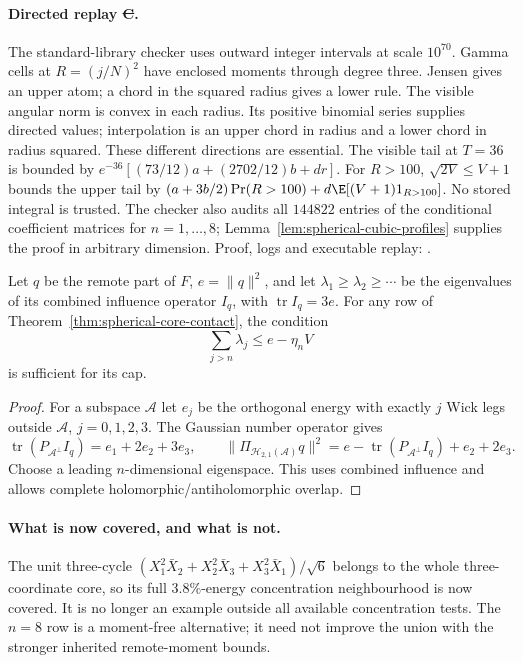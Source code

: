 \paragraph{Directed replay \st{C}.}
The standard-library checker uses outward integer intervals at scale
$10^{70}$. Gamma cells at $R=(j/N)^2$ have enclosed moments through
degree three. Jensen gives an upper atom; a chord in the squared
radius gives a lower rule. The visible angular norm is convex in
each radius. Its positive binomial series supplies directed values;
interpolation is an upper chord in radius and a lower chord in radius
squared. These different directions are essential.
The visible tail at $T=36$ is bounded by
$e^{-36}[(73/12)a+(2702/12)b+dr]$.
For $R>100$, $\sqrt{2V}\le V+1$ bounds the upper tail by
$(a+3b/2)\Pr(R>100)+d\E[(V+1)1_{R>100}]$.
No stored integral is trusted. The checker also audits all
$144822$ entries of the conditional coefficient matrices for
$n=1,\ldots,8$; Lemma~\ref{lem:spherical-cubic-profiles} supplies
the proof in arbitrary dimension. Proof, logs and executable replay:
.

\begin{corollary}
\label{cor:spherical-core-influence}
Let $q$ be the remote part of $F$, $e=\|q\|^2$, and let
$\lambda_1\ge\lambda_2\ge\cdots$ be the eigenvalues of its
combined influence operator $I_q$, with $\operatorname{tr}I_q=3e$.
For any row of Theorem~\ref{thm:spherical-core-contact}, the condition
\[
 \boxed{\sum_{j>n}\lambda_j\le e-\eta_n V}
\]
is sufficient for its cap.
\end{corollary}
\begin{proof}
For a subspace $\mathcal A$ let $e_j$ be the orthogonal energy with
exactly $j$ Wick legs outside $\mathcal A$, $j=0,1,2,3$.
The Gaussian number operator gives
\[
 \operatorname{tr}(P_{\mathcal A^\perp}I_q)=e_1+2e_2+3e_3,
 \qquad
 \|\Pi_{\mathcal H_{2,1}(\mathcal A)}q\|^2
 =e-\operatorname{tr}(P_{\mathcal A^\perp}I_q)+e_2+2e_3.
\]
Choose a leading $n$-dimensional eigenspace. This uses combined
influence and allows complete holomorphic/antiholomorphic overlap.
\end{proof}

\paragraph{What is now covered, and what is not.}
The unit three-cycle
$(X_1^2\bar X_2+X_2^2\bar X_3+X_3^2\bar X_1)/\sqrt6$
belongs to the whole three-coordinate core, so its full
$3.8\%$-energy concentration neighbourhood is now covered.
It is no longer an example outside all available concentration tests.
The $n=8$ row is a moment-free alternative; it need not improve the
union with the stronger inherited remote-moment bounds.

